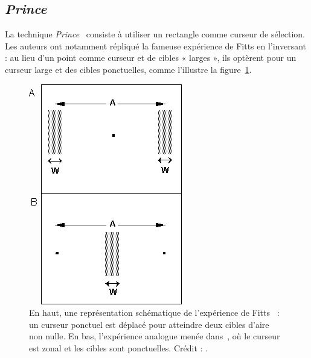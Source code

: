 	\subsection{\emph{Prince}}
	La technique \emph{Prince}~\cite{kabbash1995prince} consiste à utiliser un rectangle comme curseur de sélection. Les auteurs ont notamment répliqué la fameuse expérience de Fitts en l'inversant : au lieu d'un point comme curseur et de cibles « larges », ils optèrent pour un curseur large et des cibles ponctuelles, comme l'illustre la figure~\ref{fig:princeCursor}.
	
	\begin{figure}[ht]
		\centering
		\includegraphics[width=\textwidth]{figures/ch2/princeCursor}
		\caption[\emph{Prince} et son curseur]{En haut, une représentation schématique de l'expérience de Fitts~\cite{fitts1954information} : un curseur ponctuel est déplacé pour atteindre deux cibles d'aire non nulle. En bas, l'expérience analogue menée dans~\cite{kabbash1995prince}, où le curseur est zonal et les cibles sont ponctuelles. Crédit : \cite{kabbash1995prince}.}
		\label{fig:princeCursor}
	\end{figure}
	
